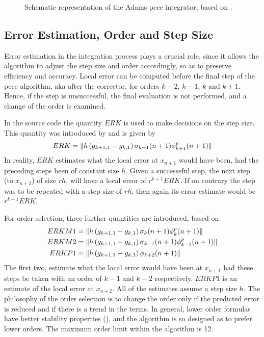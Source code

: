 \begin{figure}
  \centering
  
  \caption{Schematic representation of the Adams \gls{pece} integrator, based 
    on \cite{Shampine1975}.}
  \label{fig:adams-pece}
\end{figure}

\subsection{Error Estimation, Order and Step Size}\label{ssec:integrator-error-estimation}
Error estimation in the integration process plays a crucial role, since it allows 
the algorithm to adjust the step size and order accordingly, so as to preserve 
efficiency and accuracy. Local error can be computed before the final step of the 
\gls{pece} algorithm, aka after the corrector, for orders $k-2$, $k-1$, $k$ and 
$k+1$. Hence, if the step is unsuccessful, the final evaluation is not performed, 
and a change of the order is examined.

In the source code the quantity $ERK$ is used to make decisions on the step size. 
This quantity was introduced by \cite{Shampine1975} and is given by
\begin{equation}
  ERK = \lVert h \left( g_{k+1,1} - g_{k,1} \right) \sigma _{k+1}(n+1) \phi ^{p}_{k+1}(n+1)\rVert
\end{equation}
In reality, $ERK$ estimates what the local error at $x_{n+1}$ would have been, 
had the preceding steps been of constant size $h$. Given a successeful step, the 
next step (to $x_{n+2}$) of size $rh$, will have a local error of $r^{k+1} ERK$. 
If on contrary the step was to be repeated with a step size of $rh$, then again 
its error estimate would be $r^{k+1} ERK$.

For order selection, three further quantities are introduced, based on \cite{Shampine1975}
\begin{align}
  ERKM1 &= \lVert h \left( g_{k+1,1} - g_{k,1} \right) \sigma _{k}(n+1) \phi ^{p}_{k}(n+1)\rVert \\
  ERKM2 &= \lVert h \left( g_{k+1,1} - g_{k,1} \right) \sigma _{k-1}(n+1) \phi ^{p}_{k-1}(n+1)\rVert\\
  ERKP1 &= \lVert h \left( g_{k+1,1} - g_{k,1} \right) \phi _{k+2}(n+1)\rVert
\end{align}
The first two, estimate what the local error would have been at $x_{n+1}$ had these 
steps be taken with an order of $k-1$ and $k-2$ respectively. $ERKP1$ is an estimate 
of the local error at $x_{n+2}$. All of the estimates assume a step size $h$. 
The philosophy of the order selection is to change the order only if the predicted 
error is reduced and if there is a trend in the terms. In general, lower order 
formulas have better stability properties (\cite{Shampine1975}), and the algorithm 
is so designed as to prefer lower orders. The maximum order limit within the 
algorithm is 12.

